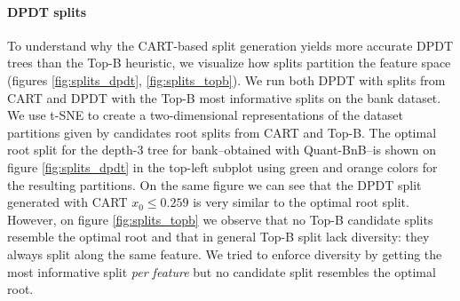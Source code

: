\paragraph{DPDT splits} To understand why the CART-based split generation yields more accurate DPDT trees than the Top-B heuristic, we visualize how splits partition the feature space (figures \ref{fig:splits_dpdt}, \ref{fig:splits_topb}). We run both DPDT with splits from CART and DPDT with the Top-B most informative splits on the bank dataset. We use t-SNE to create a two-dimensional representations of the dataset partitions given by candidates root splits from CART and Top-B. 
The optimal root split for the depth-3 tree for bank--obtained with Quant-BnB--is shown on figure \ref{fig:splits_dpdt} in the top-left subplot using green and orange colors for the resulting partitions. On the same figure we can see that the DPDT split generated with CART $x_0 \leq 0.259$ is very similar to the optimal root split. However, on figure \ref{fig:splits_topb} we observe that no Top-B candidate splits resemble the optimal root and that in general Top-B split lack diversity: they always split along the same feature. We tried to enforce diversity by getting the most informative split \textit{per feature} but no candidate split resembles the optimal root.

